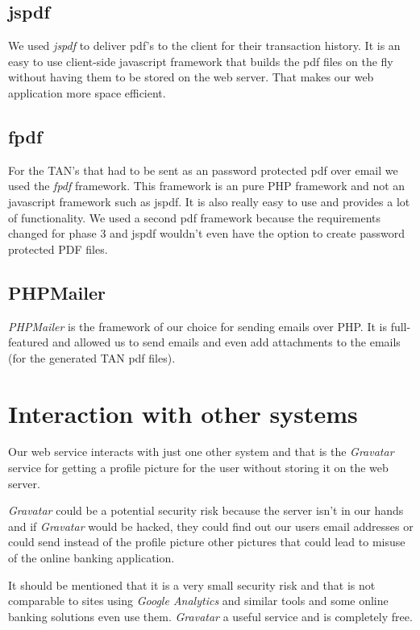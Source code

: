 \documentclass[headsepline,footsepline,footinclude=false,oneside,fontsize=11pt,paper=a4,listof=totoc,bibliography=totoc]{scrbook} %
\begin{document}
\subsection{jspdf}

We used \textit{jspdf} to deliver pdf's to the client for their transaction history. It is an easy to use client-side javascript framework that builds the pdf files on the fly without having them to be stored on the web server. That makes our web application more space efficient.

\subsection{fpdf}

For the TAN's that had to be sent as an password protected pdf over email we used the \textit{fpdf} framework. This framework is an pure PHP framework and not an javascript framework such as jspdf. It is also really easy to use and provides a lot of functionality. We used a second pdf framework because the requirements changed for phase 3 and jspdf wouldn't even have the option to create password protected PDF files.

\subsection{PHPMailer}

\textit{PHPMailer} is the framework of our choice for sending emails over PHP. It is full-featured and allowed us to send emails and even add attachments to the emails (for the generated TAN pdf files).

\pagebreak

\section{Interaction with other systems}

Our web service interacts with just one other system and that is the \textit{Gravatar} service for getting a profile picture for the user without storing it on the web server.

\textit{Gravatar} could be a potential security risk because the server isn't in our hands and if \textit{Gravatar} would be hacked, they could find out our users email addresses or could send instead of the profile picture other pictures that could lead to misuse of the online banking application.

It should be mentioned that it is a very small security risk and that is not comparable to sites using \textit{Google Analytics} and similar tools and some online banking solutions even use them. \textit{Gravatar} a useful service and is completely free.
\end{document}
